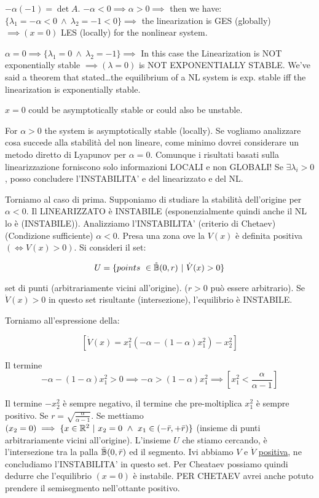 \begin{itemize}
$-\alpha(-1) = \det{A}$.
$-\alpha < 0 \implies \alpha>0 \implies$ then we have: $\{\lambda_1=-\alpha<0\ \land\ \lambda_2=-1<0\} \implies$ the linearization is GES (globally) $\implies (x=0)$ LES (locally) for the nonlinear system.

$\alpha=0 \implies \{\lambda_1=0\ \land\ \lambda_2=-1\} \implies$ In this case the Linearization is NOT exponentially stable $\implies (\lambda=0)$ is NOT EXPONENTIALLY STABLE. We've said a theorem that stated\dots the equilibrium of a NL system is exp. stable iff the linearization is exponentially stable.

$x=0$ could be asymptotically stable or could also be unstable.

For $\alpha>0$ the system is asymptotically stable (locally). Se vogliamo analizzare cosa succede alla stabilità del non lineare, come minimo dovrei considerare un metodo diretto di Lyapunov per $\alpha=0$. Comunque i risultati basati sulla linearizzazione forniscono solo informazioni LOCALI e non GLOBALI! Se $\exists\lambda_i>0$, posso concludere l'INSTABILITA' e del linearizzato e del NL.

Torniamo al caso di prima. Supponiamo di studiare la stabilità dell'origine per $\alpha<0$. Il LINEARIZZATO è INSTABILE (esponenzialmente quindi anche il NL lo è (INSTABILE)). Analizziamo l'INSTABILITA' (criterio di Chetaev) (Condizione sufficiente) $\alpha<0$. Presa una zona ove la $V(x)$ è definita positiva $(\iff V(x)>0)$.
Si consideri il set:

\[
	U = \{points\ \in\oball(0,r)\ |\ \dot{V}(x) > 0\}
\]

set di punti (arbitrariamente vicini all'origine). ($r>0$ può essere arbitrario). Se $\dot{V}(x)>0$ in questo set risultante (intersezione), l'equilibrio è INSTABILE.

Torniamo all'espressione della:

\[
	[\dot{V}(x) = x_1^2(-\alpha -(1-\alpha)x_1^2) - x_2^2]
\]

Il termine
\[
	-\alpha-(1-\alpha)x_1^2 > 0 \implies -\alpha>(1-\alpha)x_1^2 \implies [x_1^2 < \frac{\alpha}{\alpha-1}]
\]

Il termine $-x_2^2$ è sempre negativo, il termine che pre-moltiplica $x_1^2$ è sempre positivo. Se $r=\sqrt{\frac{\alpha}{\alpha-1}}$. Se mettiamo $(x_2=0) \implies \{x\in\R^2\ |\ x_2=0\ \land\ x_1\in(-\bar{r},+\bar{r})\}$ (insieme di punti arbitrariamente vicini all'origine). L'insieme $U$ che stiamo cercando, è l'intersezione tra la palla $\bar{\mathbb{B}}(0,\bar{r})$ ed il segmento. Ivi abbiamo $V$ e $\dot{V}$ \underline{positiva}, ne concludiamo l'INSTABILITA' in questo set. Per Cheataev possiamo quindi dedurre che l'equilibrio $(x=0)$ è instabile. PER CHETAEV avrei anche potuto prendere il semisegmento nell'ottante positivo.


\end{itemize}
